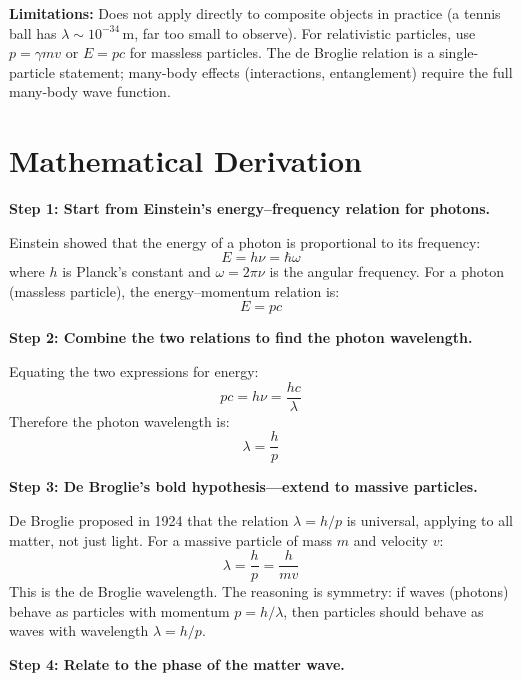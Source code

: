 \textbf{Limitations:} Does not apply directly to composite objects in practice (a tennis ball has $\lambda \sim 10^{-34}\,\text{m}$, far too small to observe). For relativistic particles, use $p = \gamma mv$ or $E = pc$ for massless particles. The de Broglie relation is a single-particle statement; many-body effects (interactions, entanglement) require the full many-body wave function.


\section*{Mathematical Derivation}

\textbf{Step 1: Start from Einstein's energy--frequency relation for photons.}

Einstein showed that the energy of a photon is proportional to its frequency:
\begin{equation}
E = h\nu = \hbar\omega
\end{equation}
where $h$ is Planck's constant and $\omega = 2\pi\nu$ is the angular frequency. For a photon (massless particle), the energy--momentum relation is:
\begin{equation}
E = pc
\end{equation}

\textbf{Step 2: Combine the two relations to find the photon wavelength.}

Equating the two expressions for energy:
\begin{equation}
pc = h\nu = \frac{hc}{\lambda}
\end{equation}
Therefore the photon wavelength is:
\begin{equation}
\lambda = \frac{h}{p}
\end{equation}

\textbf{Step 3: De Broglie's bold hypothesis---extend to massive particles.}

De Broglie proposed in 1924 that the relation $\lambda = h/p$ is universal, applying to all matter, not just light. For a massive particle of mass $m$ and velocity $v$:
\begin{equation}
\lambda = \frac{h}{p} = \frac{h}{mv}
\end{equation}
This is the de Broglie wavelength. The reasoning is symmetry: if waves (photons) behave as particles with momentum $p = h/\lambda$, then particles should behave as waves with wavelength $\lambda = h/p$.

\textbf{Step 4: Relate to the phase of the matter wave.}

